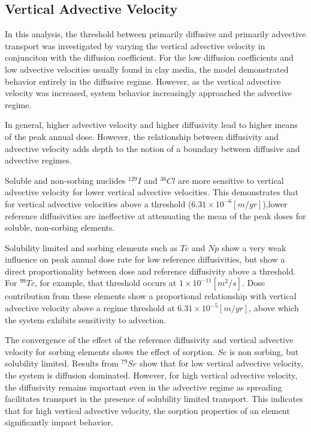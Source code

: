 \subsection{Vertical Advective Velocity}

In this analysis, the threshold between primarily diffusive and primarily 
advective transport was investigated by varying the vertical advective velocity 
in conjunciton with the diffusion coefficient. 
For the low diffusion coefficients and low advective 
velocities usually found in clay media, the model demonstrated behavior entirely 
in the diffusive regime. However, as the vertical advective velocity was 
increased, system behavior increasingly approached the advective regime. 

In general, higher advective velocity and higher diffusivity lead to higher 
means of the peak annual dose. However, the relationship between diffusivity and 
advective velocity adds depth to the notion of a boundary between diffusive and 
advective regimes.

Soluble and non-sorbing nuclides $^{129}I$ and 
$^{36}Cl$ are more sensitive to vertical advective velocity for lower vertical 
advective velocities. This demonstrates that for vertical advective velocities 
above a threshold ($6.31\times10^{-6}[m/yr]$),lower reference diffusivities are 
ineffective at attenuating the mean of the peak doses for soluble, non-sorbing 
elements. 

Solubility limited and sorbing elements such as $Tc$ and $Np$ show a very weak 
influence on peak annual dose rate for low reference diffusivities, but show a 
direct proportionality between dose and reference diffusivity above a threshold. 
For $^{99}Tc$, for example, that threshold occurs at $1\times10^{-11}[m^2/s]$.  
Dose contribution from these elements show a proportional 
relationship with vertical advective velocity above a regime threshold at 
$6.31\times10^{-5}[m/yr]$, above which the system exhibits sensitivity to 
advection. 

The convergence of the effect of the reference diffusivity and vertical 
advective velocity for sorbing elements shows the effect of sorption. $Se$ is 
non sorbing, but solubility limited.  Results from $^{79}Se$ show that for low 
vertical advective velocity, the system is diffusion dominated.  However, for 
high vertical advective velocity, the diffusivity remains important even in the 
advective regime as spreading facilitates transport in the presence of 
solubility limited transport. This indicates that for high vertical advective 
velocity, the sorption properties of an element significantly impact 
behavior. 
